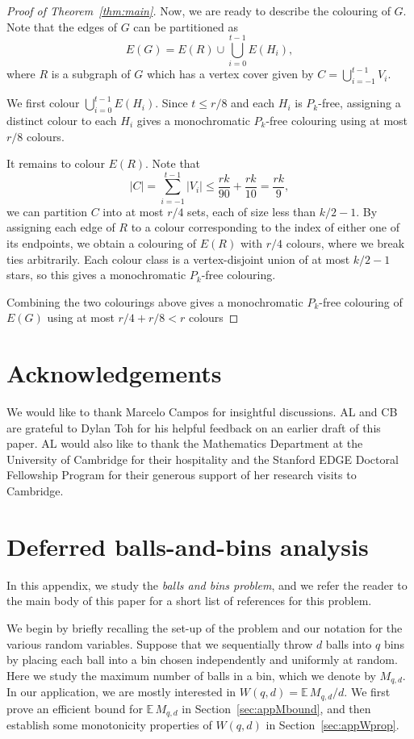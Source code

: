 \documentclass[12pt,reqno]{amsart}
\theoremstyle{remark}
\numberwithin{theorem}{section}
\renewcommand{\(}{\bigl(}
\renewcommand{\)}{\bigr)\vphantom{)}}
\renewcommand{\leq}{\le}
\renewcommand{\le}{\leqslant}
\begin{document}
\begin{proof}[Proof of Theorem~\ref{thm:main}]
Now, we are ready to describe the colouring of $G$. Note that the edges of $G$ can be partitioned as
\[E(G)=E(R)\cup\bigcup_{i=0}^{t-1}E(H_i),\]
where $R$ is a subgraph of $G$ which has a vertex cover given by $C=\bigcup_{i=-1}^{t-1}V_i$.


We first colour $\bigcup_{i=0}^{t-1}E(H_i)$. Since $t\leq r/8$ and each $H_i$ is $P_k$-free, assigning a distinct colour to each $H_i$ gives a monochromatic $P_k$-free colouring using at most $r/8$ colours.

It remains to colour $E(R)$. Note that \[|C|=\sum_{i=-1}^{t-1}|V_i|\leq \frac{rk}{90}+\frac{rk}{10}=\frac{rk}{9},\] we can partition $C$ into at most $r/4$ sets, each of size less than $k/2-1$. By assigning each edge of $R$ to a colour corresponding to the index of either one of its endpoints, we obtain a colouring of $E(R)$ with $r/4$ colours, where we break ties arbitrarily. Each colour class is a vertex-disjoint union of at most $k/2-1$ stars, so this gives a monochromatic $P_k$-free colouring.

Combining the two colourings above gives a monochromatic $P_k$-free colouring of $E(G)$
using at most $r/4+r/8<r$ colours
\end{proof}

\section*{Acknowledgements}
We would like to thank Marcelo Campos for insightful discussions. AL and CB are grateful to Dylan Toh for his helpful feedback on an earlier draft of this paper. AL would also like to thank the Mathematics Department at the University of Cambridge for their hospitality and the Stanford EDGE Doctoral Fellowship Program for their generous support of her research visits to Cambridge.




\section{Deferred balls-and-bins analysis}\label{app:balls-bins}

In this appendix, we study the \emph{balls and bins problem}, and we refer the reader to the main body of this paper for a short list of references for this problem. 

We begin by briefly recalling the set-up of the problem and our notation for the various random variables. Suppose that we sequentially throw $d$ balls into $q$ bins by placing each ball into a bin chosen independently and uniformly at random. Here we study the maximum number of balls in a bin, which we denote by $M_{q,d}$. In our application, we are mostly interested in $W(q,d) = \mathbb{E}\, M_{q,d}/d$. We first prove an efficient bound for $\mathbb{E}\, M_{q,d}$ in Section~\ref{sec:appMbound}, and then establish some monotonicity properties of $W(q,d)$ in Section~\ref{sec:appWprop}.
\end{document}
